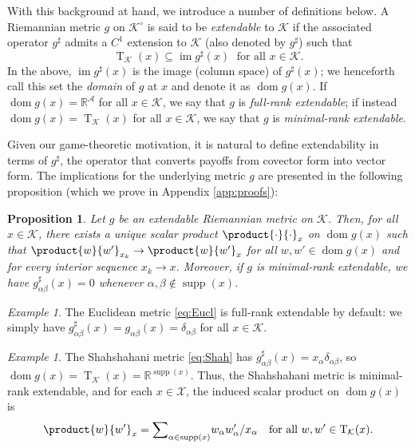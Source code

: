\documentclass[reqno]{amsart}
\theoremstyle{plain}
\newtheorem{proposition}[theorem]{Proposition}
\theoremstyle{definition}
\theoremstyle{remark}
\newtheorem{example}[theorem]{Example}
\numberwithin{equation}{section}
\numberwithin{theorem}{section}
\begin{document}
With this background at hand, we introduce a number of definitions below.
A Riemannian metric $g$ on ${{\mathcal{K}}^{\circ}}$ is said to be \emph{extendable} to ${\mathcal{K}}$ if the associated operator $g^{\sharp}$ admits a $C^1$ extension to ${\mathcal{K}}$ (also denoted by $g^{\sharp}$) such that
\begin{equation}
\label{eq:extension}
\operatorname{T}_{\mathcal{K}}(x)
	\subseteq \operatorname{im} g^{\sharp}(x)\;\text{ for all }x\in{\mathcal{K}}.
\end{equation}
In the above, $\operatorname{im} g^{\sharp}(x)$ is the image (column space) of $g^{\sharp}(x)$;
we henceforth call this set the \emph{domain} of $g$ at $x$ and denote it as ${\operatorname{dom} g}(x)$.
If ${\operatorname{dom} g}(x) = {\mathbb{R}}^{\mathcal{A}}$ for all $x \in {\mathcal{K}}$, we say that $g$ is \emph{full-rank extendable};
if instead ${\operatorname{dom} g}(x) = \operatorname{T}_{\mathcal{K}}(x)$ for all $x \in {\mathcal{K}}$, we say that $g$ is \emph{minimal-rank extendable}.

Given our game-theoretic motivation, it is natural to define extendability in terms of $g^{\sharp}$, the operator that converts payoffs from covector form into vector form.
The implications for the underlying metric $g$ are presented in the following proposition (which we prove in Appendix \ref{app:proofs}):

\begin{proposition}
\label{prop:extension}
Let $g$ be an extendable Riemannian metric on ${\mathcal{K}}$.
Then, for all $x\in{\mathcal{K}}$, there exists a unique scalar product $\product{\mathopen{}\cdot\mathopen{}}{\mathopen{}\cdot\mathopen{}}_{x}$ on ${\operatorname{dom} g}(x) $ such that $\product{w}{w'}_{x_{k}} \to \product{w}{w'}_{x}$ for all $w,w'\in{\operatorname{dom} g}(x)$ and for every interior sequence $x_{k}\to x$.
Moreover, if $g$ is minimal-rank extendable, we have $g_{\alpha\beta}^{\sharp}(x) = 0$ whenever $\alpha,\beta\notin\operatorname{supp}(x)$.
\end{proposition}

\begin{example}
\label{ex:Eucl-ext}
The Euclidean metric \eqref{eq:Eucl} is full-rank extendable by default:
we simply have $g_{\alpha\beta}^{\sharp}(x)=g_{\alpha\beta}(x) = \delta_{\alpha\beta}$ for all $x\in{\mathcal{K}}$.
\end{example}

\begin{example}
\label{ex:Shah-ext}
The Shahshahani metric \eqref{eq:Shah} has $g_{\alpha\beta}^{\sharp}(x) = x_{\alpha} \delta_{\alpha\beta}$, so ${\operatorname{dom} g}(x) =\operatorname{T}_{\mathcal{K}}(x) = {\mathbb{R}}^{\operatorname{supp}(x)}$.
Thus, the Shahshahani metric is minimal-rank extendable, and for each $x \in {\mathcal{X}}$, the induced scalar product on ${\operatorname{dom} g}(x)$ is
\begin{equation}
\product{w}{w'}_{x}
	= {\sum\nolimits}_{\alpha\in\operatorname{supp}(x)} w_{\alpha} w_{\alpha}' / x_{\alpha}
	\quad
	\text{for all $w,w' \in \operatorname{T}_{\mathcal{K}}(x)$.}
\end{equation}
\end{example}
\end{document}
